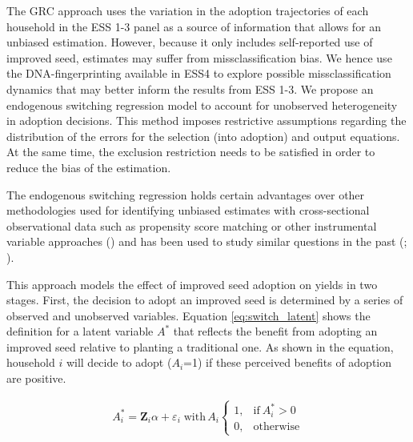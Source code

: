 \documentclass[11pt]{article}
\begin{document}
The GRC approach uses the variation in the adoption trajectories of each household in the ESS 1-3 panel as a source of information that allows for an unbiased estimation. However, because it only includes self-reported use of improved seed, estimates may suffer from missclassification bias. We hence use the  DNA-fingerprinting available in ESS4 to explore possible missclassification dynamics that may better inform the results from ESS 1-3. We propose an endogenous switching regression model to account for unobserved heterogeneity in adoption decisions. This method imposes restrictive assumptions regarding the distribution of the errors for the selection (into adoption) and output equations. At the same time, the exclusion restriction needs to be satisfied in order to reduce the bias of the estimation. 

The endogenous switching regression holds certain advantages over other methodologies used for identifying unbiased estimates with cross-sectional observational data such as propensity score matching or other instrumental variable approaches (\citealp{Shiferaw2014-op}) and has been used to study similar questions in the past (\citealp{falco2011does}; \citealp{kabunga2012yield}). \par
This approach models the effect of improved seed adoption on yields in two stages. First, the decision to adopt an improved seed is determined by a series of observed and unobserved variables. Equation \ref{eq:switch_latent} shows the definition for a latent variable $A^*$ that reflects the benefit from adopting an improved seed relative to planting a traditional one. As shown in the equation, household $i$ will decide to adopt ($A_i$=1) if these perceived benefits of adoption are positive.

\begin{align}
A_i^*=\bm{Z}_i\alpha+\varepsilon_i \; \text{with} \, A_i    \begin{cases}
      1, & \text{if}\ A_i^*>0 \\
      0, & \text{otherwise}
    \end{cases} \label{eq:switch_latent}
\end{align}
\end{document}
